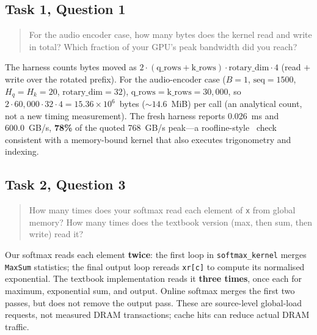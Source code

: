 \subsection{Task 1, Question 1}
\label{sec:q1}
\begin{quote}
For the audio encoder case, how many bytes does the kernel read and write in total? Which fraction of your GPU's peak bandwidth did you reach?
\end{quote}
The harness counts bytes moved as
$2 \cdot (\text{q\_rows} + \text{k\_rows}) \cdot \text{rotary\_dim} \cdot 4$
(read $+$ write over the rotated prefix). For the audio-encoder case
($B{=}1$, $\mathrm{seq}{=}1500$, $H_q{=}H_k{=}20$, $\text{rotary\_dim}{=}32$),
$\text{q\_rows}{=}\text{k\_rows}{=}30{,}000$, so
$2 \cdot 60{,}000 \cdot 32 \cdot 4 = 15.36 \times 10^6$~bytes (${\sim}14.6$~MiB)
per call (an analytical count, not a new timing measurement).
The fresh harness reports 0.026~ms and 600.0~GB/s, \textbf{78\%} of the
quoted 768~GB/s peak---a roofline-style~\cite{williams2009roofline} check
consistent with a memory-bound kernel that also executes trigonometry and indexing.

\subsection{Task 2, Question 3}
\label{sec:q2}
\begin{quote}
How many times does your softmax read each element of \texttt{x} from global memory? How many times does the textbook version (max, then sum, then write) read it?
\end{quote}
Our softmax reads each element \textbf{twice}: the first loop in
\texttt{softmax\_kernel} merges \texttt{MaxSum} statistics; the final output loop
rereads \texttt{xr[c]} to compute its normalised exponential.
The textbook implementation reads it \textbf{three times}, once each for maximum,
exponential sum, and output. Online softmax merges the first two passes, but
does not remove the output pass. These are source-level global-load requests,
not measured DRAM transactions; cache hits can reduce actual DRAM traffic.

